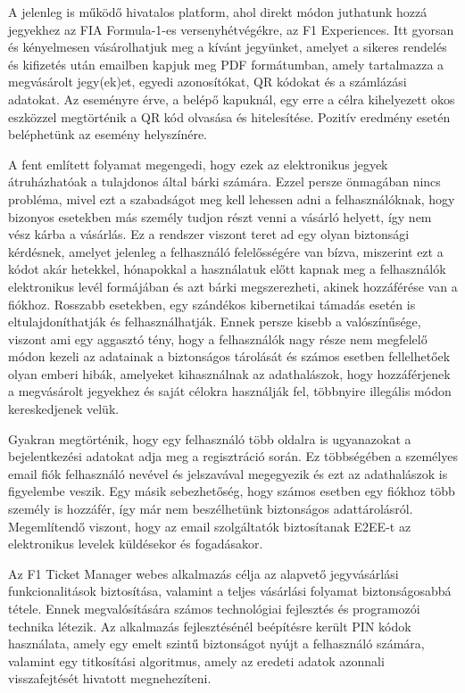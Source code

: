 A jelenleg is működő hivatalos platform, ahol direkt módon juthatunk hozzá jegyekhez az FIA Formula-1-es versenyhétvégékre, az F1 Experiences. Itt gyorsan és kényelmesen vásárolhatjuk meg a kívánt jegyünket, amelyet a sikeres rendelés és kifizetés után emailben kapjuk meg PDF formátumban, amely tartalmazza a megvásárolt jegy(ek)et, egyedi azonosítókat, QR kódokat és a számlázási adatokat. Az eseményre érve, a belépő kapuknál, egy erre a célra kihelyezett okos eszközzel megtörténik a QR kód olvasása és hitelesítése. Pozitív eredmény esetén beléphetünk az esemény helyszínére.

A fent említett folyamat megengedi, hogy ezek az elektronikus jegyek átruházhatóak a tulajdonos által bárki számára. Ezzel persze önmagában nincs probléma, mivel ezt a szabadságot meg kell lehessen adni a felhasználóknak, hogy bizonyos esetekben más személy tudjon részt venni a vásárló helyett, így nem vész kárba a vásárlás. Ez a rendszer viszont teret ad egy olyan biztonsági kérdésnek, amelyet jelenleg a felhasználó felelősségére van bízva, miszerint ezt a kódot akár hetekkel, hónapokkal a használatuk előtt kapnak meg a felhasználók elektronikus levél formájában és azt bárki megszerezheti, akinek hozzáférése van a fiókhoz. Rosszabb esetekben, egy szándékos kibernetikai támadás esetén is eltulajdoníthatják és felhasználhatják. Ennek persze kisebb a valószínűsége, viszont ami egy aggasztó tény, hogy a felhasználók nagy része nem megfelelő módon kezeli az adatainak a biztonságos tárolását és számos esetben fellelhetőek olyan emberi hibák, amelyeket kihasználnak az adathalászok, hogy hozzáférjenek a megvásárolt jegyekhez és saját célokra használják fel, többnyire illegális módon kereskedjenek velük.

\pagebreak
Gyakran megtörténik, hogy egy felhasználó több oldalra is ugyanazokat a bejelentkezési adatokat adja meg a regisztráció során. Ez többségében a személyes email fiók felhasználó nevével és jelszavával megegyezik és ezt az adathalászok is figyelembe veszik. Egy másik sebezhetőség, hogy számos esetben egy fiókhoz több személy is hozzáfér, így már nem beszélhetünk biztonságos adattárolásról. Megemlítendő viszont, hogy az email szolgáltatók biztosítanak E2EE-t az elektronikus levelek küldésekor és fogadásakor.

Az F1 Ticket Manager webes alkalmazás célja az alapvető jegyvásárlási funkcionalitások biztosítása, valamint a teljes vásárlási folyamat biztonságosabbá tétele. Ennek megvalósítására számos technológiai fejlesztés és programozói technika létezik. Az alkalmazás fejlesztésénél beépítésre került PIN kódok használata, amely egy emelt szintű biztonságot nyújt a felhasználó számára, valamint egy titkosítási algoritmus, amely az eredeti adatok azonnali visszafejtését hivatott megnehezíteni. 